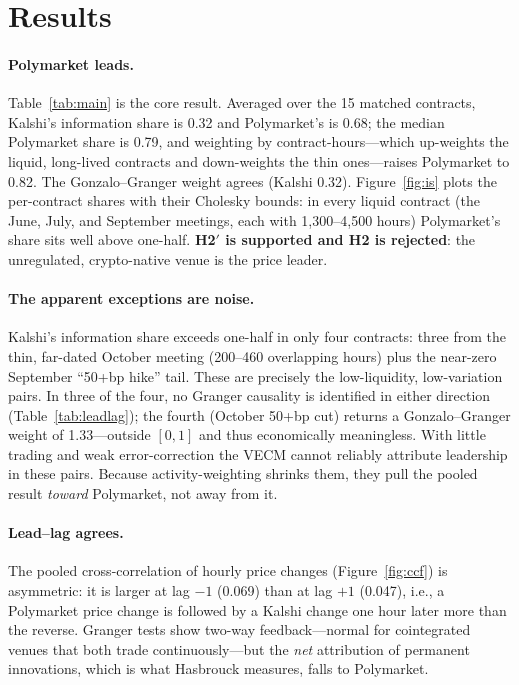 \documentclass[12pt]{article}
\begin{document}
\section{Results}\label{sec:res}
\paragraph{Polymarket leads.} Table~\ref{tab:main} is the core result. Averaged over the 15
matched contracts, Kalshi's information share is 0.32 and Polymarket's is 0.68; the median
Polymarket share is 0.79, and weighting by contract-hours---which up-weights the liquid,
long-lived contracts and down-weights the thin ones---raises Polymarket to 0.82. The
Gonzalo--Granger weight agrees (Kalshi 0.32). Figure~\ref{fig:is} plots the per-contract
shares with their Cholesky bounds: in every liquid contract (the June, July, and September
meetings, each with 1{,}300--4{,}500 hours) Polymarket's share sits well above one-half.
\textbf{H2$'$ is supported and H2 is rejected}: the unregulated, crypto-native venue is the
price leader.

\paragraph{The apparent exceptions are noise.} Kalshi's information share exceeds one-half in
only four contracts: three from the thin, far-dated October meeting (200--460 overlapping
hours) plus the near-zero September ``50+bp hike'' tail. These are precisely the
low-liquidity, low-variation pairs. In three of the four, no Granger causality is identified
in either direction (Table~\ref{tab:leadlag}); the fourth (October 50+bp cut) returns a
Gonzalo--Granger weight of 1.33---outside $[0,1]$ and thus economically meaningless. With
little trading and weak error-correction the VECM cannot reliably attribute leadership in
these pairs. Because activity-weighting shrinks them, they pull the pooled result
\emph{toward} Polymarket, not away from it.

\paragraph{Lead--lag agrees.} The pooled cross-correlation of hourly price changes
(Figure~\ref{fig:ccf}) is asymmetric: it is larger at lag $-1$ (0.069) than at lag $+1$
(0.047), i.e., a Polymarket price change is followed by a Kalshi change one hour later more
than the reverse. Granger tests show two-way feedback---normal for cointegrated venues that
both trade continuously---but the \emph{net} attribution of permanent innovations, which is
what Hasbrouck measures, falls to Polymarket.
\end{document}
